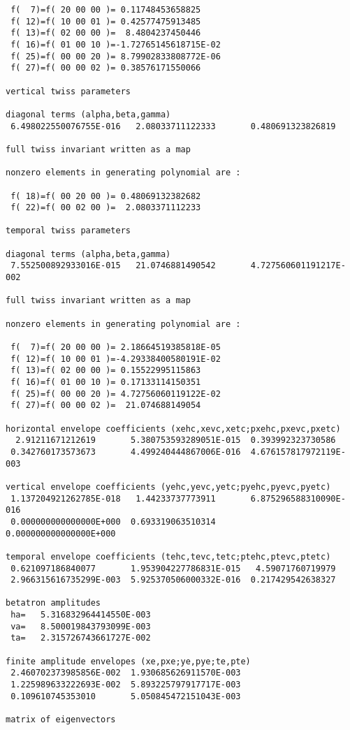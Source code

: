 \begin{footnotesize}
\begin{verbatim}
 f(  7)=f( 20 00 00 )= 0.11748453658825
 f( 12)=f( 10 00 01 )= 0.42577475913485
 f( 13)=f( 02 00 00 )=  8.4804237450446
 f( 16)=f( 01 00 10 )=-1.72765145618715E-02
 f( 25)=f( 00 00 20 )= 8.79902833808772E-06
 f( 27)=f( 00 00 02 )= 0.38576171550066

vertical twiss parameters

diagonal terms (alpha,beta,gamma)
 6.498022550076755E-016   2.08033711122333       0.480691323826819

full twiss invariant written as a map

nonzero elements in generating polynomial are :

 f( 18)=f( 00 20 00 )= 0.48069132382682
 f( 22)=f( 00 02 00 )=  2.0803371112233

temporal twiss parameters

diagonal terms (alpha,beta,gamma)
 7.552500892933016E-015   21.0746881490542       4.727560601191217E-002

full twiss invariant written as a map

nonzero elements in generating polynomial are :

 f(  7)=f( 20 00 00 )= 2.18664519385818E-05
 f( 12)=f( 10 00 01 )=-4.29338400580191E-02
 f( 13)=f( 02 00 00 )= 0.15522995115863
 f( 16)=f( 01 00 10 )= 0.17133114150351
 f( 25)=f( 00 00 20 )= 4.72756060119122E-02
 f( 27)=f( 00 00 02 )=  21.074688149054

horizontal envelope coefficients (xehc,xevc,xetc;pxehc,pxevc,pxetc)
  2.91211671212619       5.380753593289051E-015  0.393992323730586
 0.342760173573673       4.499240444867006E-016  4.676157817972119E-003

vertical envelope coefficients (yehc,yevc,yetc;pyehc,pyevc,pyetc)
 1.137204921262785E-018   1.44233737773911       6.875296588310090E-016
 0.000000000000000E+000  0.693319063510314       0.000000000000000E+000

temporal envelope coefficients (tehc,tevc,tetc;ptehc,ptevc,ptetc)
 0.621097186840077       1.953904227786831E-015   4.59071760719979
 2.966315616735299E-003  5.925370506000332E-016  0.217429542638327

betatron amplitudes
 ha=   5.316832964414550E-003
 va=   8.500019843793099E-003
 ta=   2.315726743661727E-002

finite amplitude envelopes (xe,pxe;ye,pye;te,pte)
 2.460702373985856E-002  1.930685626911570E-003
 1.225989633222693E-002  5.893225797917717E-003
 0.109610745353010       5.050845472151043E-003

matrix of eigenvectors


\end{verbatim}
\end{footnotesize}
